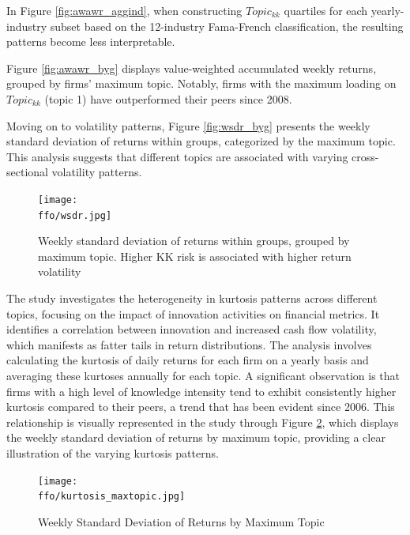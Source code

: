 \documentclass[12pt, letterpaper]{article}
\begin{document}
In Figure \ref{fig:awawr_aggind}, when constructing $Topic_{kk}$ quartiles for each yearly-industry subset based on the 12-industry Fama-French classification, the resulting patterns become less interpretable.


Figure \ref{fig:awawr_byg} displays value-weighted accumulated weekly returns, grouped by firms' maximum topic. Notably, firms with the maximum loading on $Topic_{kk}$ (topic 1) have outperformed their peers since 2008.


Moving on to volatility patterns, Figure \ref{fig:wsdr_byg} presents the weekly standard deviation of returns within groups, categorized by the maximum topic. This analysis suggests that different topics are associated with varying cross-sectional volatility patterns.

\begin{figure}[h!]
			\centering
			\texttt{[image: \\ffo/wsdr.jpg]}
			\label{fig:wsdr}
			\caption{Weekly standard deviation of returns within groups, grouped by maximum topic. Higher KK risk is associated with higher return volatility}
\end{figure}


The study investigates the heterogeneity in kurtosis patterns across different topics, focusing on the impact of innovation activities on financial metrics. It identifies a correlation between innovation and increased cash flow volatility, which manifests as fatter tails in return distributions. The analysis involves calculating the kurtosis of daily returns for each firm on a yearly basis and averaging these kurtoses annually for each topic. A significant observation is that firms with a high level of knowledge intensity tend to exhibit consistently higher kurtosis compared to their peers, a trend that has been evident since 2006. This relationship is visually represented in the study through Figure \ref{fig:kurtosis_maxtopic}, which displays the weekly standard deviation of returns by maximum topic, providing a clear illustration of the varying kurtosis patterns.

\begin{figure}[h!]
\centering
\texttt{[image: \\ffo/kurtosis\_maxtopic.jpg]}
\caption{Weekly Standard Deviation of Returns by Maximum Topic}
\label{fig:kurtosis_maxtopic}
\end{figure}
\end{document}
